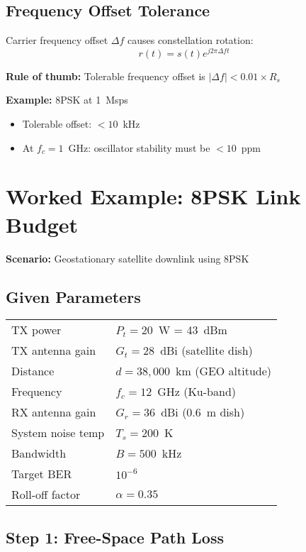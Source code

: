 \subsection{Frequency Offset Tolerance}

Carrier frequency offset $\Delta f$ causes constellation rotation:
\begin{equation}
r(t) = s(t)e^{j2\pi\Delta f t}
\end{equation}

\textbf{Rule of thumb:} Tolerable frequency offset is $|\Delta f| < 0.01 \times R_s$

\textbf{Example:} 8PSK at 1~Msps
\begin{itemize}
\item Tolerable offset: $< 10$~kHz
\item At $f_c = 1$~GHz: oscillator stability must be $< 10$~ppm
\end{itemize}

\section{Worked Example: 8PSK Link Budget}

\textbf{Scenario:} Geostationary satellite downlink using 8PSK

\subsection*{Given Parameters}

\begin{tabular}{@{}ll@{}}
TX power & $P_t = 20$~W = 43~dBm \\
TX antenna gain & $G_t = 28$~dBi (satellite dish) \\
Distance & $d = 38{,}000$~km (GEO altitude) \\
Frequency & $f_c = 12$~GHz (Ku-band) \\
RX antenna gain & $G_r = 36$~dBi (0.6~m dish) \\
System noise temp & $T_s = 200$~K \\
Bandwidth & $B = 500$~kHz \\
Target BER & $10^{-6}$ \\
Roll-off factor & $\alpha = 0.35$ \\
\end{tabular}

\subsection*{Step 1: Free-Space Path Loss}

